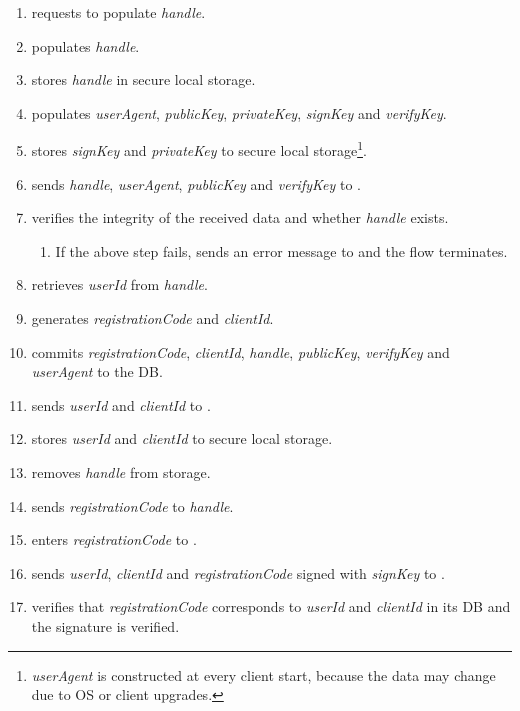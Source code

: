 \documentclass[a4paper,10pt,draft]{article}
\newcommand{\handle}{\emph{handle}}
\newcommand{\registrationCode}{\emph{registrationCode}}
\newcommand{\userAgent}{\emph{userAgent}}
\newcommand{\privateKey}{\emph{privateKey}}
\newcommand{\publicKey}{\emph{publicKey}}
\newcommand{\signKey}{\emph{signKey}}
\newcommand{\verifyKey}{\emph{verifyKey}}
\newcommand{\userId}{\emph{userId}}
\newcommand{\clientId}{\emph{clientId}}
\begin{document}
\begin{enumerate}\label{device_registration_flow}
 \item\label{device_registration_flow:first} \Client{} requests \User{} to populate \handle{}.
 \item \User{} populates \handle{}.
 \item \Client{} stores \handle{} in secure local storage.
 \item \Client{} populates \userAgent{}, \publicKey{}, \privateKey{}, \signKey{} and \verifyKey{}.
 \item \Client{} stores \signKey{} and \privateKey{} to secure local storage\footnote{\userAgent{} is constructed at every client start, because the data may change due to OS or 
client upgrades.}.
 \item \Client{} sends \handle{}, \userAgent{}, \publicKey{} and \verifyKey{} to \Server{}.
 \item\label{device_registration_flow:fifth} \Server{} verifies the integrity of the received data and whether \handle{} exists.
 \begin{enumerate}
  \item If the above step fails, \Server{} sends an error message to \Client{} and the flow terminates.
 \end{enumerate}
 \item\label{device_registration_flow:retrieve} \Server{} retrieves \userId{} from \handle{}.
 \item\label{device_registration_flow:sixth} \Server{} generates \registrationCode{} and \clientId{}.
 \item\label{device_registration_flow:seventh} \Server{} commits \registrationCode{}, \clientId{}, \handle{}, \publicKey{}, \verifyKey{} and \userAgent{} to the DB.
 \item \Server{} sends \userId{} and \clientId{} to \Client{}.
 \item\label{device_registration_flow:second} \Client{} stores \userId{} and \clientId{} to secure local storage.
 \item \Client{} removes \handle{} from storage.
 \item \Server{} sends \registrationCode{} to \handle{}.
 \item\label{device_registration_flow:eighth} \User{} enters \registrationCode{} to \Client{}.
 \item\label{device_registration_flow:third} \Client{} sends \userId{}, \clientId{} and \registrationCode{} signed with \signKey{} to \Server{}.
 \item \Server{} verifies that \registrationCode{} corresponds to \userId{} and \clientId{} in its DB and the signature is verified.

\end{enumerate}
\end{document}
